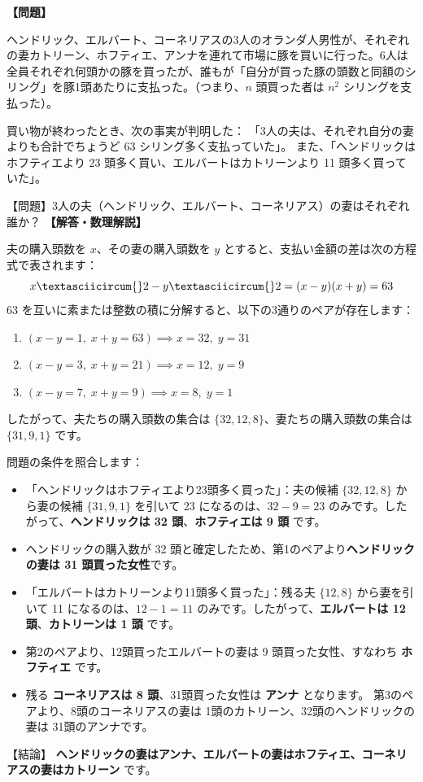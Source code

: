 \documentclass[10pt,a4paper,oneside,openany]{ltjsbook}
\begin{document}
\begin{tcolorbox}[colback=softblue,colframe=primaryblue,title=\textbf{第 139 問：オランダ人の妻たち（豚の購入と夫婦の組み合わせ） （原題: THE DUTCHMEN'S WIVES.）},arc=2mm,boxrule=1pt,breakable]
\textbf{【問題】}\par\vspace{0.3em}
ヘンドリック、エルバート、コーネリアスの3人のオランダ人男性が、それぞれの妻カトリーン、ホフティエ、アンナを連れて市場に豚を買いに行った。6人は全員それぞれ何頭かの豚を買ったが、誰もが「自分が買った豚の頭数と同額のシリング」を豚1頭あたりに支払った。（つまり、$n$ 頭買った者は $n^2$ シリングを支払った）。

買い物が終わったとき、次の事実が判明した：
「3人の夫は、それぞれ自分の妻よりも合計でちょうど 63 シリング多く支払っていた」。
また、「ヘンドリックはホフティエより 23 頭多く買い、エルバートはカトリーンより 11 頭多く買っていた」。

【問題】3人の夫（ヘンドリック、エルバート、コーネリアス）の妻はそれぞれ誰か？
\tcblower
\textbf{【解答・数理解説】}\par\vspace{0.3em}
夫の購入頭数を $x$、その妻の購入頭数を $y$ とすると、支払い金額の差は次の方程式で表されます：
\[ x\textasciicircum{}2 - y\textasciicircum{}2 = (x - y)(x + y) = 63 \]
63 を互いに素または整数の積に分解すると、以下の3通りのペアが存在します：
\begin{enumerate}[leftmargin=2em]
\item $(x-y=1,\; x+y=63) \implies x = 32,\; y = 31$
\item $(x-y=3,\; x+y=21) \implies x = 12,\; y = 9$
\item $(x-y=7,\; x+y=9) \implies x = 8,\; y = 1$
\end{enumerate}
したがって、夫たちの購入頭数の集合は $\{32, 12, 8\}$、妻たちの購入頭数の集合は $\{31, 9, 1\}$ です。

問題の条件を照合します：
\begin{itemize}[leftmargin=2em]
\item 「ヘンドリックはホフティエより23頭多く買った」：夫の候補 $\{32, 12, 8\}$ から妻の候補 $\{31, 9, 1\}$ を引いて 23 になるのは、$32 - 9 = 23$ のみです。したがって、\textbf{ヘンドリックは 32 頭}、\textbf{ホフティエは 9 頭} です。
\item ヘンドリックの購入数が 32 頭と確定したため、第1のペアより\textbf{ヘンドリックの妻は 31 頭買った女性}です。
\item 「エルバートはカトリーンより11頭多く買った」：残る夫 $\{12, 8\}$ から妻を引いて 11 になるのは、$12 - 1 = 11$ のみです。したがって、\textbf{エルバートは 12 頭}、\textbf{カトリーンは 1 頭} です。
\item 第2のペアより、12頭買ったエルバートの妻は 9 頭買った女性、すなわち \textbf{ホフティエ} です。
\item 残る \textbf{コーネリアスは 8 頭}、31頭買った女性は \textbf{アンナ} となります。
第3のペアより、8頭のコーネリアスの妻は 1頭のカトリーン、32頭のヘンドリックの妻は 31頭のアンナです。
\end{itemize}

【結論】
\textbf{ヘンドリックの妻はアンナ、エルバートの妻はホフティエ、コーネリアスの妻はカトリーン} です。
\end{tcolorbox}
\end{document}
